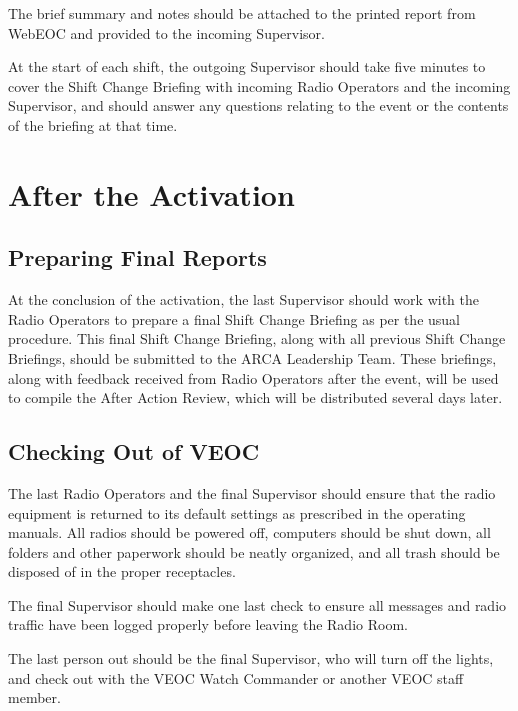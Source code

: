 \documentclass[pdflatex,letterpaper,twoside,12pt]{book}
\begin{document}
The brief summary and notes should be attached to the printed report from WebEOC and provided to the incoming Supervisor.

At the start of each shift, the outgoing Supervisor should take five minutes to cover the Shift Change Briefing with incoming Radio Operators and the incoming Supervisor, and should answer any questions relating to the event or the contents of the briefing at that time.


\section{After the Activation}

\subsection{Preparing Final Reports}

At the conclusion of the activation, the last Supervisor should work with the Radio Operators to prepare a final Shift Change Briefing as per the usual procedure.  This final Shift Change Briefing, along with all previous Shift Change Briefings, should be submitted to the ARCA Leadership Team.  These briefings, along with feedback received from Radio Operators after the event, will be used to compile the After Action Review, which will be distributed several days later.

\subsection{Checking Out of VEOC}

The last Radio Operators and the final Supervisor should ensure that the radio equipment is returned to its default settings as prescribed in the operating manuals.  All radios should be powered off, computers should be shut down, all folders and other paperwork should be neatly organized, and all trash should be disposed of in the proper receptacles.

The final Supervisor should make one last check to ensure all messages and radio traffic have been logged properly before leaving the Radio Room.

The last person out should be the final Supervisor, who will turn off the lights, and check out with the VEOC Watch Commander or another VEOC staff member.
\end{document}

